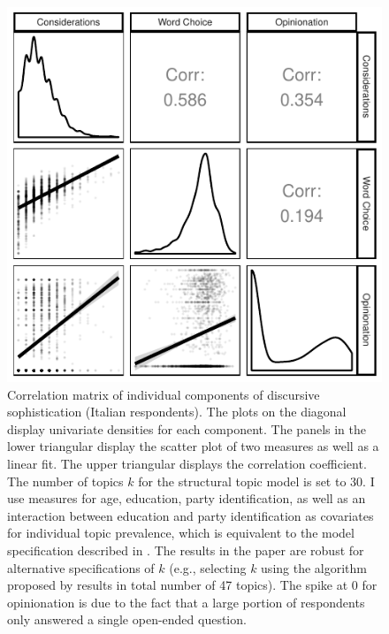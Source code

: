 \documentclass[12pt]{article}
\begin{document}
\begin{figure}[h]\centering
\includegraphics{../fig/swiss_corplot_italian_components.pdf}
\caption{Correlation matrix of individual components of discursive sophistication (Italian respondents). The plots on the diagonal display univariate densities for each component. The panels in the lower triangular display the scatter plot of two measures as well as a linear fit. The upper triangular displays the correlation coefficient. The number of topics $k$ for the structural topic model is set to 30. I use measures for age, education, party identification, as well as an interaction between education and party identification as covariates for individual topic prevalence, which is equivalent to the model specification described in \citet{roberts2014structural}. The results in the paper are robust for alternative specifications of $k$ (e.g., selecting $k$ using the algorithm proposed by \citet{lee2014low} results in total number of 47 topics). The spike at 0 for opinionation is due to the fact that a large portion of respondents only answered a single open-ended question.}\label{fig:swiss_italian_components}
\end{figure}
\end{document}
